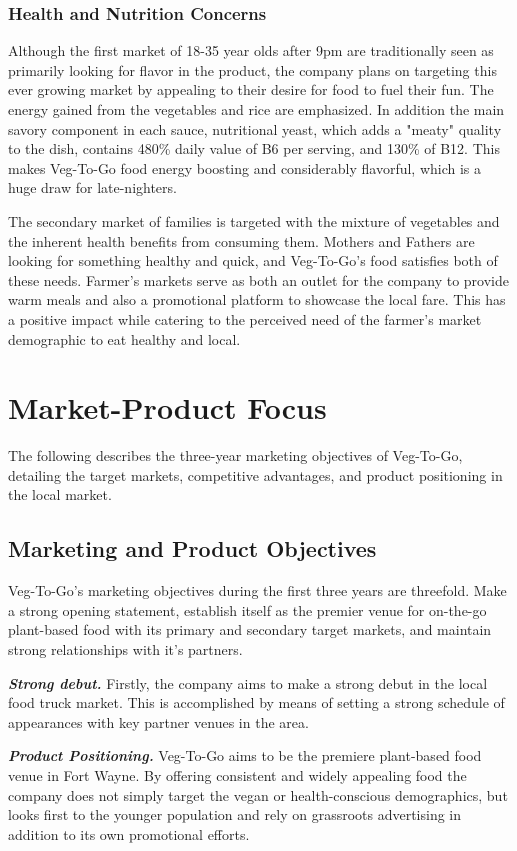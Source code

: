 \documentclass[12pt, letterpaper]{article}
\newcommand{\companyname}{Veg-To-Go}
\begin{document}
\subsubsection{Health and Nutrition Concerns}
Although the first market of 18-35 year olds after 9pm are traditionally seen as primarily looking for flavor in the product, the company plans on targeting this ever growing market by appealing to their desire for food to fuel their fun.  The energy gained from the vegetables and rice are emphasized.  In addition the main savory component in each sauce, nutritional yeast, which adds a "meaty" quality to the dish, contains 480\% daily value of B6 per serving, and 130\% of B12. \cite{yeast} This makes \companyname{} food energy boosting and considerably flavorful, which is a huge draw for late-nighters.

The secondary market of families is targeted with the mixture of vegetables and the inherent health benefits from consuming them.  Mothers and Fathers are looking for something healthy and quick, and \companyname{}'s food satisfies both of these needs. Farmer's markets serve as both an outlet for the company to provide warm meals and also a promotional platform to showcase the local fare. This has a positive impact while catering to the perceived need of the farmer's market demographic to eat healthy and local.

\section{Market-Product Focus}
The following describes the three-year marketing objectives of \companyname{}, detailing the target markets, competitive advantages, and product positioning in the local market.
\subsection{Marketing and Product Objectives}
\companyname's{} marketing objectives during the first three years are threefold.  Make a strong opening statement, establish itself as the premier venue for on-the-go plant-based food with its primary and secondary target markets, and maintain strong relationships with it's partners. 

\textbf{\emph{Strong debut.}} Firstly, the company aims to make a strong debut in the local food truck market.  This is accomplished by means of setting a strong schedule of appearances with key partner venues in the area.

\textbf{\emph{Product Positioning.}} \companyname{} aims to be the premiere plant-based food venue in Fort Wayne.  By offering consistent and widely appealing food the company does not simply target the vegan or health-conscious demographics, but looks first to the younger population and rely on grassroots advertising in addition to its own promotional efforts.
\end{document}
